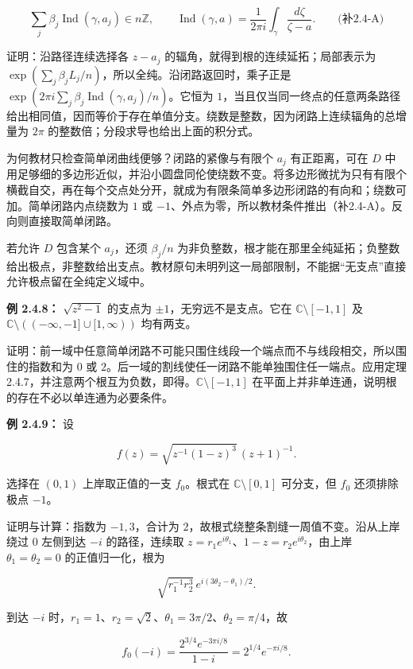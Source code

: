 \documentclass[11pt,a4paper]{article}
\begin{document}
\[
\sum_j\beta_j\operatorname{Ind}(\gamma,a_j)\in n\mathbb Z,
\qquad
\operatorname{Ind}(\gamma,a)=\frac1{2\pi i}\int_\gamma\frac{d\zeta}{\zeta-a}.
\qquad\text{(补2.4-A)}
\]

证明：沿路径连续选择各 \(z-a_j\) 的辐角，就得到根的连续延拓；局部表示为
\(\exp(\sum_j\beta_j L_j/n)\)，所以全纯。沿闭路返回时，乘子正是
\(\exp(2\pi i\sum_j\beta_j\operatorname{Ind}(\gamma,a_j)/n)\)。它恒为
\(1\)，当且仅当同一终点的任意两条路径给出相同值，因而等价于存在单值分支。绕数是整数，因为闭路上连续辐角的总增量为
\(2\pi\) 的整数倍；分段求导也给出上面的积分式。

为何教材只检查简单闭曲线便够？闭路的紧像与有限个 \(a_j\) 有正距离，可在
\(D\)
中用足够细的多边形近似，并沿小圆盘同伦使绕数不变。将多边形微扰为只有有限个横截自交，再在每个交点处分开，就成为有限条简单多边形闭路的有向和；绕数可加。简单闭路内点绕数为
\(1\) 或
\(-1\)、外点为零，所以教材条件推出（补2.4-A）。反向则直接取简单闭路。

若允许 \(D\) 包含某个 \(a_j\)，还须 \(\beta_j/n\)
为非负整数，根才能在那里全纯延拓；负整数给出极点，非整数给出支点。教材原句未明列这一局部限制，不能据``无支点''直接允许极点留在全纯定义域中。

\textbf{例 2.4.8：} \(\sqrt{z^2-1}\) 的支点为
\(\pm1\)，无穷远不是支点。它在 \(\mathbb C\setminus[-1,1]\) 及
\(\mathbb C\setminus((-\infty,-1]\cup[1,\infty))\) 均有两支。

证明：前一域中任意简单闭路不可能只围住线段一个端点而不与线段相交，所以围住的指数和为
\(0\) 或 \(2\)。后一域的割线使任一闭路不能单独围住任一端点。应用定理
2.4.7，并注意两个根互为负数，即得。\(\mathbb C\setminus[-1,1]\)
在平面上并非单连通，说明根的存在不必以单连通为必要条件。

\textbf{例 2.4.9：} 设

\[
f(z)=\sqrt{z^{-1}(1-z)^3}\,(z+1)^{-1}.
\]

选择在 \((0,1)\) 上岸取正值的一支 \(f_0\)。根式在
\(\mathbb C\setminus[0,1]\) 可分支，但 \(f_0\) 还须排除极点 \(-1\)。

证明与计算：指数为 \(-1,3\)，合计为
\(2\)，故根式绕整条割缝一周值不变。沿从上岸绕过 \(0\) 左侧到达 \(-i\)
的路径，连续取 \(z=r_1e^{i\theta_1}\)、\(1-z=r_2e^{i\theta_2}\)，由上岸
\(\theta_1=\theta_2=0\) 的正值归一化，根为

\[
\sqrt{r_1^{-1}r_2^3}\,e^{i(3\theta_2-\theta_1)/2}.
\]

到达 \(-i\)
时，\(r_1=1\)、\(r_2=\sqrt2\)、\(\theta_1=3\pi/2\)、\(\theta_2=\pi/4\)，故

\[
f_0(-i)=\frac{2^{3/4}e^{-3\pi i/8}}{1-i}=2^{1/4}e^{-\pi i/8}.
\]
\end{document}
